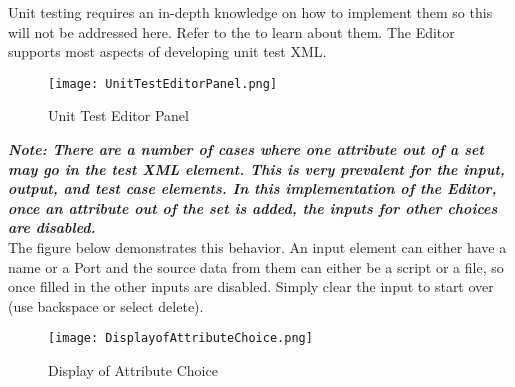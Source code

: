 Unit testing requires an in-depth knowledge on how to implement them so this will not be addressed here. Refer to the  to learn about them.
The Editor supports most aspects of developing unit test XML.\\

\begin{figure}[h!]
	\centering
	\caption{Unit Test Editor Panel}{}
	\texttt{[image: UnitTestEditorPanel.png]}
 \end{figure}

\textbf{\emph{Note: There are a number of cases where one attribute out of a set may go in the test XML element. This is very prevalent for the input, output, and test case elements. In this implementation of the Editor, once an attribute out of the set is added, the inputs for other choices are disabled.}}\\

The figure below demonstrates this behavior. An input element can either have a name or a Port and the source data from them can either be a script or a file, so once filled in the other inputs are disabled. Simply clear the input to start over (use backspace or select delete).\\
\begin{figure}[h!]
	\centering
	\caption{Display of Attribute Choice}{}
	\texttt{[image: DisplayofAttributeChoice.png]}
 \end{figure}

